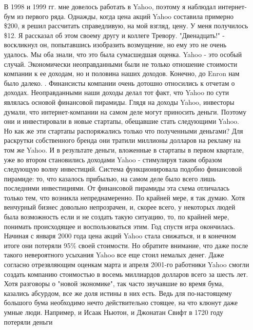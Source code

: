 \documentclass[ebook,12pt,oneside,openany]{memoir}
\begin{document}
\maketitle

В 1998 и 1999 гг. мне довелось работать в Yahoo, поэтому я наблюдал
интернет-бум из первого ряда. Однажды, когда цена акций Yahoo
составила примерно \$200, я решил рассчитать справедливую, на мой
взгляд, цену. У меня получилось \$12. Я рассказал об этом своему другу
и коллеге Тревору. "Двенадцать!" - воскликнул он, попытавшись
изобразить возмущение, но ему это не очень удалось. Мы оба знали, что
это была сумасшедшая оценка. Yahoo - это особый случай. Экономически
неоправданными были не только отношение стоимости компании к ее
доходам, но и половина наших доходов. Конечно, до Enron нам было
далеко. . Финансисты компании очень дотошно относились к отчетам о
доходах. Неоправданными наши доходы делал тот факт, что Yahoo по сути
являлась основой финансовой пирамиды. Глядя на доходы Yahoo, инвесторы
думали, что интернет-компании на самом деле могут приносить деньги.
Поэтому они и инвестировали в новые стартапы, обещавшие стать
следующими Yahoo. Но как же эти стартапы распоряжались только что
полученными деньгами? Для раскрутки собственного бренда они тратили
миллионы долларов на рекламу на том же Yahoo. И в результате деньги,
вложенные в стартапы в первом квартале, уже во втором становились
доходами Yahoo - стимулируя таким образом следующую волну инвестиций.
Система функционировала подобно финансовой пирамиде: то, что казалось
прибылью, на самом деле было всего лишь последними инвестициями. От
финансовой пирамиды эта схема отличалась только тем, что возникла
непреднамеренно. По крайней мере, я так думаю. Хотя венчурный бизнес
довольно непрозрачен, и, скорее всего, у некоторых людей была
возможность если и не создать такую ситуацию, то, по крайней мере,
понимать происходящее и воспользоваться этим. Год спустя игра
окончилась. Начиная с января 2000 года цена акций Yahoo стала
снижаться, и в конечном итоге они потеряли 95\% своей стоимости. Но
обратите внимание, что даже после такого невероятного усыхания Yahoo
все еще стоил немалых денег. Даже согласно отрезвляющим оценкам марта
и апреля 2001-го работники Yahoo смогли создать компанию стоимостью в
восемь миллиардов долларов всего за шесть лет. Хотя разговоры о "новой
экономике", так часто звучавшие во время бума, казались абсурдом, все
же доля истины в них есть. Ведь для по-настоящему большого бума
необходимо нечто действительно стоящее, на что клюнут даже умные люди.
Например, и Исаак Ньютон, и Джонатан Свифт в 1720 году потеряли деньги
\end{document}
